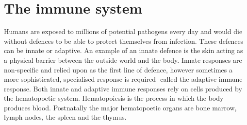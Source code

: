 \section{The immune system}
Humans are exposed to millions of potential pathogens every day and would die without defences to be able to protect themselves from infection.
These defences can be innate or adaptive.
An example of an innate defence is the skin acting as a physical barrier between the outside world and the body.
Innate responses are non-specific and relied upon as the first line of defence, however sometimes a more sophisticated, specialised response is required- called the adaptive immune response\cite{alberts2007molecularimmune}.
Both innate and adaptive immune responses rely on cells produced by the hematopoetic system.
Hematopoiesis is the process in which the body produces blood\cite{alberts2007molecularstem}.
Postnatally the major hematopoetic organs are bone marrow, lymph nodes, the spleen and the thymus.

